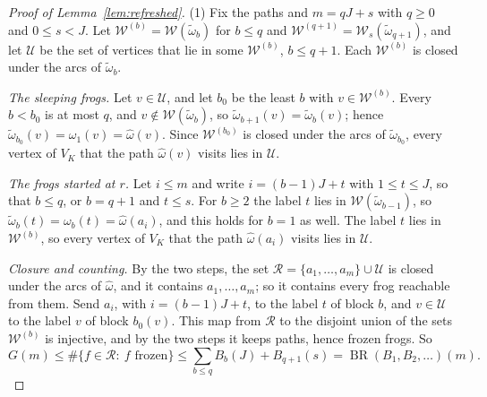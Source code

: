 \documentclass[11pt]{amsart}
\theoremstyle{definition}
\numberwithin{equation}{section}
\newcommand{\BR}{\operatorname{BR}}
\newcommand{\cU}{\mathcal{U}}
\newcommand{\cW}{\mathcal{W}}
\begin{document}
\begin{proof}[Proof of Lemma~\ref{lem:refreshed}]
(1) Fix the paths and $m=qJ+s$ with $q\ge0$ and $0\le s<J$. Let $\cW^{(b)}=\cW(\tilde\omega_b)$ for $b\le q$ and $\cW^{(q+1)}=\cW_s(\tilde\omega_{q+1})$, and let $\cU$ be the set of vertices that lie in some $\cW^{(b)}$, $b\le q+1$. Each $\cW^{(b)}$ is closed under the arcs of $\tilde\omega_b$.

\emph{The sleeping frogs.} Let $v\in\cU$, and let $b_0$ be the least $b$ with $v\in\cW^{(b)}$. Every $b<b_0$ is at most $q$, and $v\notin\cW(\tilde\omega_b)$, so $\tilde\omega_{b+1}(v)=\tilde\omega_b(v)$; hence $\tilde\omega_{b_0}(v)=\omega_1(v)=\hat\omega(v)$. Since $\cW^{(b_0)}$ is closed under the arcs of $\tilde\omega_{b_0}$, every vertex of $V_K$ that the path $\hat\omega(v)$ visits lies in $\cU$.

\emph{The frogs started at $r$.} Let $i\le m$ and write $i=(b-1)J+t$ with $1\le t\le J$, so that $b\le q$, or $b=q+1$ and $t\le s$. For $b\ge2$ the label $t$ lies in $\cW(\tilde\omega_{b-1})$, so $\tilde\omega_b(t)=\omega_b(t)=\hat\omega(a_i)$, and this holds for $b=1$ as well. The label $t$ lies in $\cW^{(b)}$, so every vertex of $V_K$ that the path $\hat\omega(a_i)$ visits lies in $\cU$.

\emph{Closure and counting.} By the two steps, the set $\mathcal{R}=\{a_1,\dots,a_m\}\cup\cU$ is closed under the arcs of $\hat\omega$, and it contains $a_1,\dots,a_m$; so it contains every frog reachable from them. Send $a_i$, with $i=(b-1)J+t$, to the label $t$ of block $b$, and $v\in\cU$ to the label $v$ of block $b_0(v)$. This map from $\mathcal{R}$ to the disjoint union of the sets $\cW^{(b)}$ is injective, and by the two steps it keeps paths, hence frozen frogs. So
\[
G(m)\le\#\{f\in\mathcal{R}:\ f\text{ frozen}\}\le\sum_{b\le q}B_b(J)+B_{q+1}(s)=\BR(B_1,B_2,\dots)(m). %
\]


\end{proof}
\end{document}
